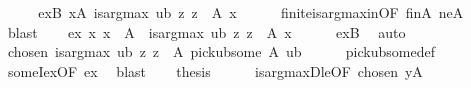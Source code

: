 \begin{isabellebody}
%
\isadelimproof
%
\endisadelimproof
%
\isatagproof
{}\isamarkupfalse%
\ {\isacharminus}{\kern0pt}\isanewline
\ \ \isamarkupfalse%
\ exB{\isacharcolon}{\kern0pt}\ {\isachardoublequoteopen}{\isasymexists}x{\isasymin}A{\isachardot}{\kern0pt}\ is{\isacharunderscore}{\kern0pt}arg{\isacharunderscore}{\kern0pt}max\ ub\ {\isacharparenleft}{\kern0pt}{\isasymlambda}z{\isachardot}{\kern0pt}\ z\ {\isasymin}\ A{\isacharparenright}{\kern0pt}\ x{\isachardoublequoteclose}\isanewline
\ \ \ \ \isamarkupfalse%
\ finite{\isacharunderscore}{\kern0pt}is{\isacharunderscore}{\kern0pt}arg{\isacharunderscore}{\kern0pt}max{\isacharunderscore}{\kern0pt}in{\isacharbrackleft}{\kern0pt}OF\ finA\ neA{\isacharbrackright}{\kern0pt}\ \isamarkupfalse%
\ blast\isanewline
\ \ \isamarkupfalse%
\ ex{\isacharcolon}{\kern0pt}\ {\isachardoublequoteopen}{\isasymexists}x{\isachardot}{\kern0pt}\ x\ {\isasymin}\ A\ {\isasymand}\ is{\isacharunderscore}{\kern0pt}arg{\isacharunderscore}{\kern0pt}max\ ub\ {\isacharparenleft}{\kern0pt}{\isasymlambda}z{\isachardot}{\kern0pt}\ z\ {\isasymin}\ A{\isacharparenright}{\kern0pt}\ x{\isachardoublequoteclose}\isanewline
\ \ \ \ \isamarkupfalse%
\ exB\ \isamarkupfalse%
\ auto\isanewline
\ \ \isamarkupfalse%
\ chosen{\isacharcolon}{\kern0pt}\ {\isachardoublequoteopen}is{\isacharunderscore}{\kern0pt}arg{\isacharunderscore}{\kern0pt}max\ ub\ {\isacharparenleft}{\kern0pt}{\isasymlambda}z{\isachardot}{\kern0pt}\ z\ {\isasymin}\ A{\isacharparenright}{\kern0pt}\ {\isacharparenleft}{\kern0pt}pick{\isacharunderscore}{\kern0pt}ub{\isacharunderscore}{\kern0pt}some\ A\ ub{\isacharparenright}{\kern0pt}{\isachardoublequoteclose}\isanewline
\ \ \ \ \isamarkupfalse%
\ pick{\isacharunderscore}{\kern0pt}ub{\isacharunderscore}{\kern0pt}some{\isacharunderscore}{\kern0pt}def\isanewline
\ \ \ \ \isamarkupfalse%
\ someI{\isacharunderscore}{\kern0pt}ex{\isacharbrackleft}{\kern0pt}OF\ ex{\isacharbrackright}{\kern0pt}\ \isamarkupfalse%
\ blast\isanewline
\ \ \isamarkupfalse%
\ {\isacharquery}{\kern0pt}thesis\isanewline
\ \ \ \ \isamarkupfalse%
\ is{\isacharunderscore}{\kern0pt}arg{\isacharunderscore}{\kern0pt}maxD{\isacharunderscore}{\kern0pt}le{\isacharbrackleft}{\kern0pt}OF\ chosen\ yA{\isacharbrackright}{\kern0pt}\ \isakeywordONE{{\isachardot}{\kern0pt}}\isamarkupfalse%
\isanewline
{}\isamarkupfalse%
%
\endisatagproof

\end{isabellebody}
